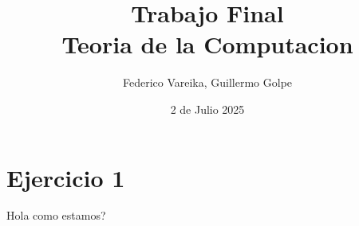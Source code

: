 \documentclass[12pt, a4paper]{article}
\title{
{Trabajo Final}\\
{\large Teoria de la Computacion}
}
\author{Federico Vareika, Guillermo Golpe}
\date{2 de Julio 2025}
\begin{document}
\maketitle

\newpage

\section*{Ejercicio 1}
Hola como estamos? 
\end{document}

